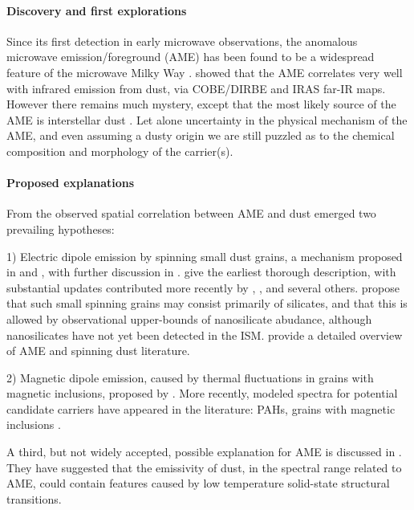   \paragraph{Discovery and first explorations}

     Since its first detection in early microwave observations, the anomalous microwave emission/foreground (AME) has been found to be a widespread feature of the microwave Milky Way \citep{dickinson13r}. \cite{kogut96,deoliveiracosta97,leitch98} showed that the AME correlates very well with infrared emission from dust, via COBE/DIRBE and IRAS far-IR maps. However there remains much mystery, except that the most likely source of the AME is interstellar dust \citep{ysard10a,tibbs11,hensley16}. Let alone uncertainty in the physical mechanism of the AME, and even assuming a dusty origin\- we are still puzzled as to the chemical composition and morphology of the carrier(s).

  \paragraph{Proposed explanations}

     From the observed spatial correlation between AME and dust emerged two prevailing hypotheses:

    1) Electric dipole emission by spinning small dust grains, a mechanism proposed in \cite{erickson57} and \cite{hoyle70}, with further discussion in \cite{ferrara94}. \cite{draine98b} give the earliest thorough description, with substantial updates contributed more recently by \cite{ysard10a}, \cite{ali-haimoud09}, \cite{hoang10} and several others. \cite{hensley17a} propose that such small spinning grains may consist primarily of silicates, and that this is allowed by observational upper-bounds of nanosilicate abudance, although nanosilicates have not yet been detected in the ISM. \cite{dickinson13r} provide a detailed overview of AME and spinning dust literature.

    2) Magnetic dipole emission, caused by thermal fluctuations in grains with magnetic inclusions, proposed by \cite{draine99}.
     More recently, modeled spectra for potential candidate carriers have appeared in the literature: PAHs, grains with magnetic inclusions \citep{draine13, ali-haimoud14, hoang16a}.

    A third, but not widely accepted, possible explanation for AME is discussed in \cite{jones09}. They have suggested that the emissivity of dust, in the spectral range related to AME, could contain features caused by low temperature solid-state structural transitions.

